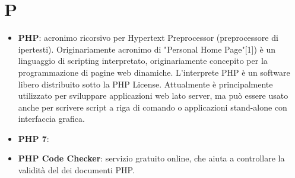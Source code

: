 \section{P}
\begin{itemize} 
	\item \textbf{PHP}: acronimo ricorsivo per Hypertext Preprocessor (preprocessore di ipertesti). Originariamente acronimo di "Personal Home Page"[1]) è un linguaggio di scripting interpretato, originariamente concepito per la programmazione di pagine web dinamiche. L'interprete PHP è un software libero distribuito sotto la PHP License. Attualmente è principalmente utilizzato per sviluppare applicazioni web lato server, ma può essere usato anche per scrivere script a riga di comando o applicazioni stand-alone con interfaccia grafica.
	\item \textbf{PHP 7}:
	\item \textbf{PHP Code Checker}: servizio gratuito online, che aiuta a controllare la validità del dei documenti PHP.
\end{itemize}

